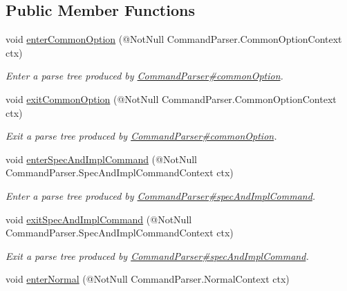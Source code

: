 \subsection*{Public Member Functions}
\begin{DoxyCompactItemize}
\item 
void \hyperlink{interfaceedu_1_1udel_1_1cis_1_1vsl_1_1civl_1_1run_1_1common_1_1CommandListener_a0ace64bfe5edcca1b747a6267d5f46a5}{enter\+Common\+Option} (@Not\+Null Command\+Parser.\+Common\+Option\+Context ctx)
\begin{DoxyCompactList}\small\item\em Enter a parse tree produced by \hyperlink{}{Command\+Parser\#common\+Option}. \end{DoxyCompactList}\item 
void \hyperlink{interfaceedu_1_1udel_1_1cis_1_1vsl_1_1civl_1_1run_1_1common_1_1CommandListener_a6fe5d742bcead79ff02e5c78f126983f}{exit\+Common\+Option} (@Not\+Null Command\+Parser.\+Common\+Option\+Context ctx)
\begin{DoxyCompactList}\small\item\em Exit a parse tree produced by \hyperlink{}{Command\+Parser\#common\+Option}. \end{DoxyCompactList}\item 
void \hyperlink{interfaceedu_1_1udel_1_1cis_1_1vsl_1_1civl_1_1run_1_1common_1_1CommandListener_a65e30f27f25f3c1752d9dee09d89b92f}{enter\+Spec\+And\+Impl\+Command} (@Not\+Null Command\+Parser.\+Spec\+And\+Impl\+Command\+Context ctx)
\begin{DoxyCompactList}\small\item\em Enter a parse tree produced by \hyperlink{}{Command\+Parser\#spec\+And\+Impl\+Command}. \end{DoxyCompactList}\item 
void \hyperlink{interfaceedu_1_1udel_1_1cis_1_1vsl_1_1civl_1_1run_1_1common_1_1CommandListener_a643145a35923f70b1f48a1b58766534e}{exit\+Spec\+And\+Impl\+Command} (@Not\+Null Command\+Parser.\+Spec\+And\+Impl\+Command\+Context ctx)
\begin{DoxyCompactList}\small\item\em Exit a parse tree produced by \hyperlink{}{Command\+Parser\#spec\+And\+Impl\+Command}. \end{DoxyCompactList}\item 
void \hyperlink{interfaceedu_1_1udel_1_1cis_1_1vsl_1_1civl_1_1run_1_1common_1_1CommandListener_a040a805ec8fdf2f1e3b12991aa896396}{enter\+Normal} (@Not\+Null Command\+Parser.\+Normal\+Context ctx)

\end{DoxyCompactItemize}
